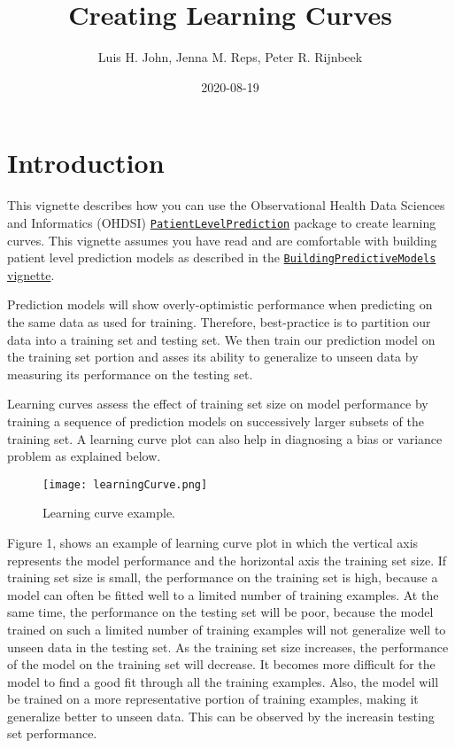 \documentclass[
]{article}
\title{Creating Learning Curves}
\author{Luis H. John, Jenna M. Reps, Peter R. Rijnbeek}
\date{2020-08-19}
\begin{document}
\maketitle

\hypertarget{introduction}{%
\section{Introduction}\label{introduction}}

This vignette describes how you can use the Observational Health Data
Sciences and Informatics (OHDSI)
\href{http://github.com/OHDSI/PatientLevelPrediction}{\texttt{PatientLevelPrediction}}
package to create learning curves. This vignette assumes you have read
and are comfortable with building patient level prediction models as
described in the
\href{https://github.com/OHDSI/PatientLevelPrediction/blob/master/inst/doc/BuildingPredictiveModels.pdf}{\texttt{BuildingPredictiveModels}
vignette}.

Prediction models will show overly-optimistic performance when
predicting on the same data as used for training. Therefore,
best-practice is to partition our data into a training set and testing
set. We then train our prediction model on the training set portion and
asses its ability to generalize to unseen data by measuring its
performance on the testing set.

Learning curves assess the effect of training set size on model
performance by training a sequence of prediction models on successively
larger subsets of the training set. A learning curve plot can also help
in diagnosing a bias or variance problem as explained below.

\begin{figure}
\centering
\texttt{[image: learningCurve.png]}
\caption{Learning curve example.}
\end{figure}

Figure 1, shows an example of learning curve plot in which the vertical
axis represents the model performance and the horizontal axis the
training set size. If training set size is small, the performance on the
training set is high, because a model can often be fitted well to a
limited number of training examples. At the same time, the performance
on the testing set will be poor, because the model trained on such a
limited number of training examples will not generalize well to unseen
data in the testing set. As the training set size increases, the
performance of the model on the training set will decrease. It becomes
more difficult for the model to find a good fit through all the training
examples. Also, the model will be trained on a more representative
portion of training examples, making it generalize better to unseen
data. This can be observed by the increasin testing set performance.
\end{document}
